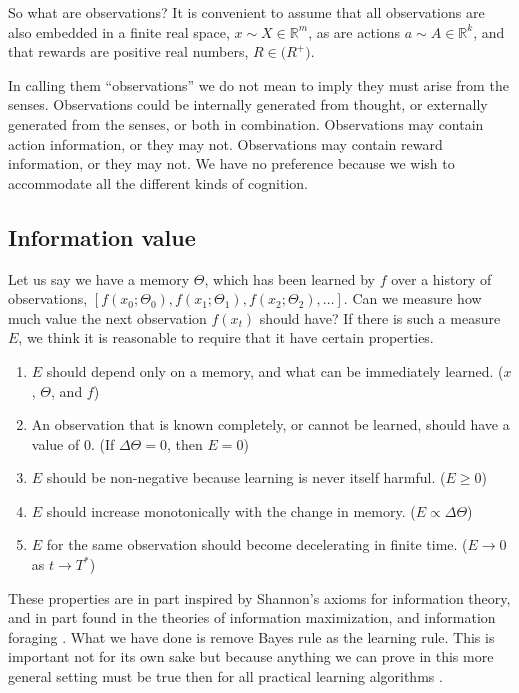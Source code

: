 So what are observations? It is convenient to assume that all observations are also embedded in a finite real space, $x \sim X \in \mathbb{R}^m$, as are actions $a \sim A \in \mathbb{R}^k$, and that rewards are positive real numbers, $R \in \mathbb(R^{+})$. 

In calling them ``observations'' we do not mean to imply they must arise from the senses. Observations could be internally generated from thought, or externally generated from the senses, or both in combination. Observations may contain action information, or they may not. Observations may contain reward information, or they may not. We have no preference because we wish to accommodate all the different kinds of cognition.

\subsection{Information value} 
Let us say we have a memory $\Theta$, which has been learned by $f$ over a history of observations, $[f(x_0; \Theta_0), f(x_1; \Theta_1), f(x_2; \Theta_2), \ldots]$. Can we measure how much value the next observation $f(x_t)$ should have? If there is such a measure $E$, we think it is reasonable to require that it have certain properties.

\begin{enumerate}
	\item $E$ should depend only on a memory, and what can be immediately learned. ($x$, $\Theta$, and $f$)
	\item An observation that is known completely, or cannot be learned, should have a value of 0. (If $\Delta \Theta = 0$, then $E=0$)
	\item $E$ should be non-negative because learning is never itself harmful. ($E \ge 0$)
	\item $E$ should increase monotonically with the change in memory. ($E \propto \Delta \Theta$)
	\item $E$ for the same observation should become decelerating in finite time. ($E \rightarrow 0$ as $t \rightarrow T^*$)
\end{enumerate}

These properties are in part inspired by Shannon's axioms for information theory, and in part found in the theories of information maximization, and information foraging \citep{Inglis2001,Reddy2016}. What we have done is remove Bayes rule as the learning rule. This is important not for its own sake but because anything we can prove in this more general setting must be true then for all practical learning algorithms \citep{MacKay2003}. 

